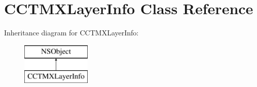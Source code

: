 \hypertarget{interface_c_c_t_m_x_layer_info}{\section{C\-C\-T\-M\-X\-Layer\-Info Class Reference}
\label{interface_c_c_t_m_x_layer_info}
}
Inheritance diagram for C\-C\-T\-M\-X\-Layer\-Info\-:\begin{figure}[H]
\begin{center}
\leavevmode
\includegraphics[height=2.000000cm]{interface_c_c_t_m_x_layer_info}
\end{center}
\end{figure}
